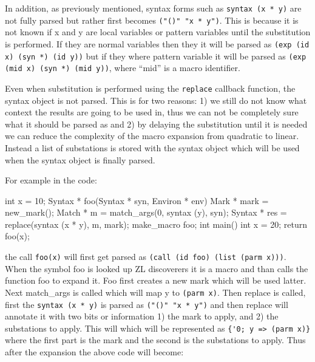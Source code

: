 \documentclass[12pt,english,letterpaper]{article}
\begin{document}
In addition, as previously mentioned, syntax forms such as
\verb/syntax (x * y)/ are not fully parsed but rather first becomes
\verb/("()" "x * y")/.  This is because it is not known if x and y are
local variables or pattern variables until the substitution is
performed.  If they are normal variables then they it will be parsed
as \verb/(exp (id x) (syn *) (id y))/ but if they where pattern
variable it will be parsed as \verb/(exp (mid x) (syn *) (mid y))/,
where ``mid'' is a macro identifier.

Even when substitution is performed using the \verb/replace/ callback
function, the syntax object is not parsed.  This is for two reasons: 1)
we still do not know what context the results are going to be used in,
thus we can not be completely sure what it should be
parsed as and 2) by delaying the substitution until it is needed we
can reduce the complexity of the macro expansion from quadratic to
linear.  Instead a list of substations is stored with the syntax
object which will be used when the syntax object is finally parsed.

For example in the code:

\begin{code}
int x = 10;
Syntax * foo(Syntax * syn, Environ * env) {
  Mark * mark = new_mark();
  Match * m = match_args(0, syntax (y), syn);
  Syntax * res = replace(syntax (x * y), m, mark);
}
make_macro foo;
int main() {
  int x = 20;
  return foo(x);
}
\end{code}

the call \verb/foo(x)/ will first get parsed as
\verb/(call (id foo) (list (parm x)))/.  When the symbol foo is looked
up ZL discoverers it is a macro and than calls the function foo to
expand it.  Foo first creates a new mark which will be used latter.
Next match\_args is called which will map y to \verb/(parm x)/.  Then
replace is called, first the \verb/syntax (x * y)/ is parsed as
\verb/("()" "x * y")/ and then replace will annotate it with two bits
or information 1) the mark to apply, and 2) the substations to apply.
This will which will be represented as \verb/{'0; y => (parm x)}/
where the first part is the mark and the second is the substations to
apply.  Thus after the expansion the above code will become:

\end{document}
